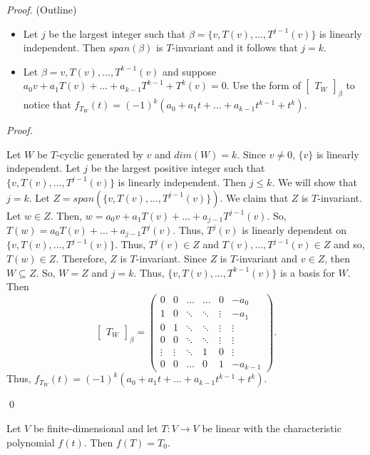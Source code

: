 \documentclass[12pt]{article}
\newenvironment{theorem}[2][Theorem]{\begin{trivlist}
\item[\hskip \labelsep {\bfseries #1}\hskip \labelsep {\bfseries #2.}]}{\end{trivlist}}
\newenvironment{sol}
    {\emph{Proof.}
    }
    {
    \qed
    }
\begin{document}
\textit{Proof.} (Outline)
\begin{itemize}
    \item[(a)] Let $j$ be the largest integer such that $\beta = \{v, T(v), \dots, T^{j - 1}(v)\}$ is linearly independent. Then $span(\beta)$ is $T$-invariant and it follows that $j = k$.
    
    \item[(b)] Let $\beta = v, T(v), \dots, T^{k - 1}(v)$ and suppose $a_0v + a_1T(v) + \dots + a_{k - 1}T^{k-1} + T^k(v) = 0$. Use the form of $\begin{bmatrix}
    T_W
    \end{bmatrix}_\beta$ to notice that $f_{T_W}(t) = (-1)^k(a_0 + a_1t + \dots + a_{k-1}t^{k-1} + t^k)$.
\end{itemize}

\begin{sol}
Let $W$ be $T$-cyclic generated by $v$ and $dim(W) = k$. Since $v \neq 0$, $\{v\}$ is linearly independent. Let $j$ be the largest positive integer such that $\{v, T(v), \dots, T^{j-1}(v)\}$ is linearly independent. Then $j \leq k$. We will show that $j = k$. Let $Z = span(\{v, T(v), \dots, T^{j-1}(v)\})$. We claim that $Z$ is $T$-invariant. Let $w \in Z$. Then, $w = a_0v + a_1T(v) + \dots + a_{j-1}T^{j-1}(v)$. So, $T(w) = a_0T(v) + \dots + a_{j-1}T^j(v)$. Thus, $T^j(v)$ is linearly dependent on $\{v, T(v), \dots, T^{j-1}(v)\}$. Thus, $T^j(v) \in Z$ and $T(v), \dots, T^{j-1}(v) \in Z$ and so, $T(w) \in Z$. Therefore, $Z$ is $T$-invariant. Since $Z$ is $T$-invariant and $v \in Z$, then $W \subseteq Z$. So, $W = Z$ and $j = k$. Thus, $\{v, T(v), \dots, T^{k-1}(v)\}$ is a basis for $W$. Then $$\begin{bmatrix}
T_W
\end{bmatrix}_\beta = \begin{pmatrix}
0 & 0 & \dots & \dots & 0 & -a_0 \\ 1 & 0 & \ddots & \ddots & \vdots & -a_1 \\ 0 & 1 & \ddots & \ddots & \vdots & \vdots \\ 0 & 0 & \ddots & \ddots & \vdots & \vdots \\ \vdots & \vdots & \ddots & 1 & 0 & \vdots \\ 0 & 0 & \dots & 0 & 1 & -a_{k-1}
\end{pmatrix}.$$ Thus, $f_{T_W}(t) = (-1)^k(a_0 + a_1t + \dots + a_{k-1}t^{k-1} + t^k)$.
\end{sol}

\begin{theorem}{5.23, Cayley-Hamilton}
Let $V$ be finite-dimensional and let $T : V \to V$ be linear with the characteristic polynomial $f(t)$. Then $f(T) = T_0$.
\end{theorem}
\end{document}
